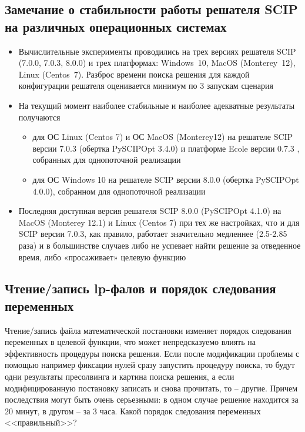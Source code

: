 \documentclass[%
	11pt,
	a4paper,
	utf8,
		]{article}
\begin{document}
\subsection{Замечание о стабильности работы решателя SCIP на различных операционных системах}

\begin{itemize}
	\item Вычислительные эксперименты проводились на трех версиях решателя SCIP (7.0.0, 7.0.3, 8.0.0) и трех платформах: Windows~10, MacOS (Monterey~12), Linux (Centos~7). Разброс времени поиска решения для каждой конфигурации решателя оценивается минимум по 3 запускам сценария
	
	\item На текущий момент наиболее стабильные и наиболее адекватные результаты получаются
	\begin{itemize}
		\item для ОС Linux (Centos 7) и ОС MacOS (Monterey12) на решателе SCIP версии 7.0.3 (обертка PySCIPOpt 3.4.0) и платформе Ecole версии 0.7.3 , собранных для однопоточной реализации
		
		\item для ОС Windows 10 на решателе SCIP версии 8.0.0 (обертка PySCIPOpt 4.0.0), собранном для однопоточной реализации
	\end{itemize}
	
	\item Последняя доступная версия решателя SCIP 8.0.0 (PySCIPOpt 4.1.0) на MacOS (Monterey 12.1) и Linux (Centos 7) при тех же настройках, что и для SCIP версии 7.0.3, как правило, работает значительно медленнее (2.5-2.85 раза) и в большинстве случаев либо не успевает найти решение за отведенное время, либо «просаживает» целевую функцию
\end{itemize}

\subsection{Чтение/запись lp-фалов и порядок следования переменных}

Чтение/запись файла математической постановки изменяет порядок следования переменных в целевой функции, что может непредсказуемо влиять на эффективность процедуры поиска решения. Если после модификации проблемы с помощью например фиксации нулей сразу запустить процедуру поиска, то будут одни результаты пресолвинга и картина поиска решения, а если модифицированную постановку записать и снова прочитать, то -- другие. Причем последствия могут быть очень серьезными: в одном случае решение находится за 20 минут, в другом -- за 3 часа. Какой порядок следования переменных <<правильный>>?
\end{document}
